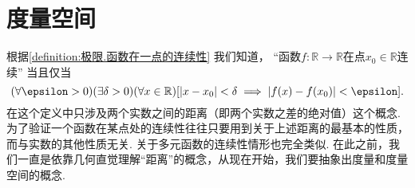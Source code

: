 \section{度量空间}
根据\cref{definition:极限.函数在一点的连续性} 我们知道，
“函数\(f\colon\mathbb{R}\to\mathbb{R}\)在点\(x_0\in\mathbb{R}\)连续”
当且仅当\begin{equation*}
	(\forall\epsilon>0)
	(\exists\delta>0)
	(\forall x\in\mathbb{R})
	[
		\abs{x - x_0}<\delta
		\implies
		\abs{f(x) - f(x_0)} < \epsilon
	].
\end{equation*}
在这个定义中只涉及两个实数之间的距离（即两个实数之差的绝对值）这个概念.
为了验证一个函数在某点处的连续性往往只要用到关于上述距离的最基本的性质，而与实数的其他性质无关.
关于多元函数的连续性情形也完全类似.
在此之前，我们一直是依靠几何直觉理解“距离”的概念，从现在开始，我们要抽象出度量和度量空间的概念.

